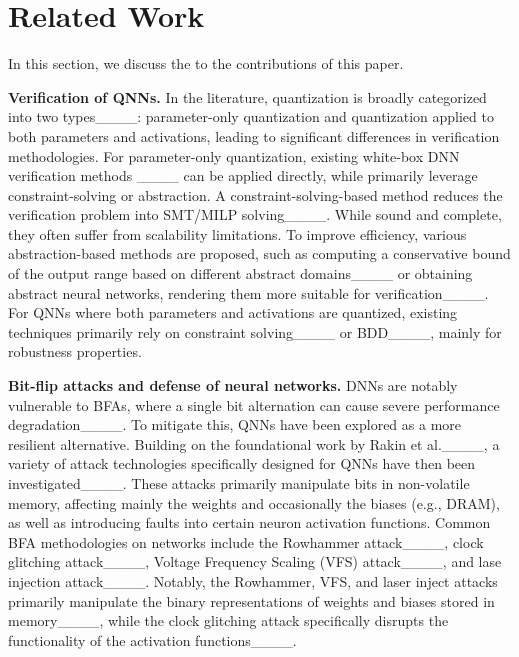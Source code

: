 \section{Related Work}
\label{sec:relatedwork}
In this section, we discuss the  to the contributions of this paper.
\vspace{2mm}

\noindent
{\bf Verification of QNNs.}
In the literature, quantization is broadly categorized into two types____: parameter-only quantization and quantization applied to both parameters and activations, leading to significant differences in verification methodologies. 
For parameter-only quantization, existing white-box DNN verification methods ____ can be applied directly, while
primarily leverage constraint-solving or abstraction. A constraint-solving-based method reduces the verification problem into 
SMT/MILP solving____. While sound and complete, they often suffer from scalability limitations. To improve efficiency, various abstraction-based methods are proposed, such as computing a conservative bound of the output range based on different abstract domains____ or obtaining abstract neural networks, rendering them more suitable for verification____. 
For QNNs where both parameters and activations are quantized, existing techniques primarily rely on constraint solving____ or BDD____, mainly for robustness properties. 
\vspace{2mm}

\noindent
{\bf Bit-flip attacks and defense of neural networks.}
DNNs are notably vulnerable to BFAs, where a single bit alternation can cause severe performance degradation____. To mitigate this, QNNs have been explored as a more resilient alternative. Building on the foundational work by Rakin et al.____, a variety of attack technologies specifically designed for QNNs have then been investigated____. These attacks primarily manipulate bits in non-volatile memory, affecting mainly the weights and occasionally the biases (e.g., DRAM), as well as introducing faults into certain neuron activation functions. Common BFA methodologies on networks include the Rowhammer attack____, clock glitching attack____, Voltage Frequency Scaling (VFS) attack____, and lase injection attack____. Notably, the Rowhammer, VFS, and laser inject attacks primarily manipulate the binary representations of weights and biases stored in memory____, while the clock glitching attack specifically disrupts the functionality of the activation functions____.

